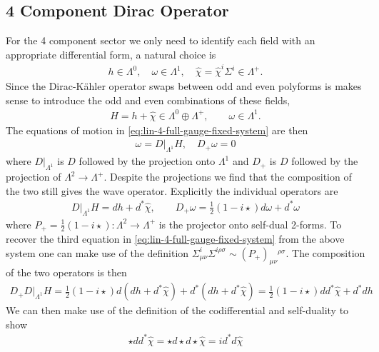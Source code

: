 \documentclass[10pt]{report}
\theoremstyle{definition}
\begin{document}
        \subsection{4 Component Dirac Operator}
        For the 4 component sector we only need to identify each field with an appropriate differential form, a natural choice is
        \begin{align}
            h \in \Lambda^0, \quad \omega \in \Lambda^1, \quad \hat{\chi} = \hat{\chi}^i \Sigma^i \in \Lambda^+.
        \end{align}
        Since the Dirac-K\"ahler operator swaps between odd and even polyforms is makes sense to introduce the odd and even combinations of these fields,
        \begin{align}
            H = h + \hat{\chi} \in \Lambda^0 \oplus \Lambda^+, \qquad \omega \in \Lambda^1.
        \end{align}
        The equations of motion in \cref{eq:lin-4-full-gauge-fixed-system} are then 
        \begin{align}
            \omega = D|_{\Lambda^1} H, \quad D_+ \omega = 0
        \end{align}
        where $D|_{\Lambda^1}$ is $D$ followed by the projection onto $\Lambda^1$ and $D_+$ is $D$ followed by the projection of $\Lambda^2 \rightarrow \Lambda^+$. Despite the projections we find that the composition of the two still gives the wave operator. Explicitly the individual operators are 
        \begin{align}
            D|_{\Lambda^1} H = dh + d^* \hat{\chi}, \qquad D_+ \omega = \frac{1}{2}(1-i \star) d\omega + d^* \omega
        \end{align}
        where $P_+ = \frac{1}{2}(1-i \star) : \Lambda^2 \rightarrow \Lambda^+$ is the projector onto self-dual 2-forms. To recover the third equation in \cref{eq:lin-4-full-gauge-fixed-system} from the above system one can make use of the definition $\Sigma^i_{\mu\nu} \Sigma^{i\rho\sigma} \sim (P_+)_{\mu\nu}{}^{\rho\sigma}$. The composition of the two operators is then
        \begin{align}
            D_+ D|_{\Lambda^1} H = \frac{1}{2}(1-i\star)d(dh + d^* \hat{\chi}) + d^*(dh + d^* \hat{\chi}) = \frac{1}{2}(1-i\star)d d^* \hat{\chi} + d^* d h
        \end{align}
        We can then make use of the definition of the codifferential and self-duality to show 
        \begin{align}
            \star d d^* \hat{\chi} = \star d \star d \star \hat{\chi} = i d^* d \hat{\chi}
        \end{align}
\end{document}
